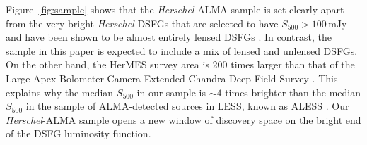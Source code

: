 \documentclass[iop]{emulateapj}
\begin{document}

Figure~\ref{fig:sample} shows that the {\it Herschel}-ALMA sample is set
clearly apart from the very bright {\it Herschel} DSFGs that are selected to
have $S_{500} > 100 \, $mJy and have been shown to be almost entirely lensed
DSFGs \citep{Negrello:2010fk, Wardlow:2013lr, Bussmann:2013lr}.  In contrast,
the sample in this paper is expected to include a mix of lensed and unlensed
DSFGs.  On the other hand, the HerMES survey area is 200 times larger than that
of the Large Apex Bolometer Camera Extended Chandra Deep Field Survey
\citep[LESS][]{Weis:2009ly}.  This explains why the median $S_{500}$ in our
sample is $\sim4$ times brighter than the median $S_{500}$ in the sample of
ALMA-detected sources in LESS, known as ALESS \citep{Hodge:2013qy}.  Our {\it
Herschel}-ALMA sample opens a new window of discovery space on the bright end
of the DSFG luminosity function.
\end{document}
